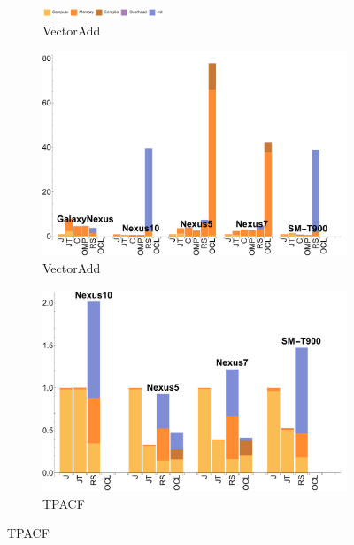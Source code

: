 \begin{figure}[ht]

  \begin{subfigure}[b]{\textwidth}
          \centering
          \includegraphics[width=0.4\textwidth]{data/legend.pdf}
          \caption{VectorAdd}\label{fig:vectoradd}
  \end{subfigure}

  \begin{subfigure}[b]{0.5\textwidth}
      \centering
      \includegraphics[width=\textwidth]{data/VectorAdd_onecompute_time.pdf}
      \caption{VectorAdd}\label{fig:vectoradd}
  \end{subfigure}
  \begin{subfigure}[b]{0.5\textwidth}
      \centering
      \includegraphics[width=\textwidth]{data/Tpacf_onecompute_time.pdf}
      \caption{TPACF}
      \label{fig:TPACF}
  \end{subfigure}


\end{figure}
